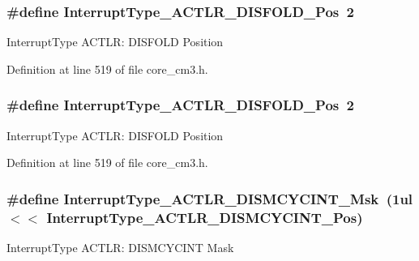 \subsubsection[{\texorpdfstring{Interrupt\+Type\+\_\+\+A\+C\+T\+L\+R\+\_\+\+D\+I\+S\+F\+O\+L\+D\+\_\+\+Pos}{InterruptType_ACTLR_DISFOLD_Pos}}]{\setlength{\rightskip}{0pt plus 5cm}\#define Interrupt\+Type\+\_\+\+A\+C\+T\+L\+R\+\_\+\+D\+I\+S\+F\+O\+L\+D\+\_\+\+Pos~2}\hypertarget{group___c_m_s_i_s___c_m3___interrupt_type_gaaa37f212111e6dbc9505d46b8bf8fa3e}{}\label{group___c_m_s_i_s___c_m3___interrupt_type_gaaa37f212111e6dbc9505d46b8bf8fa3e}
Interrupt\+Type A\+C\+T\+LR\+: D\+I\+S\+F\+O\+LD Position 

Definition at line 519 of file core\+\_\+cm3.\+h.

\subsubsection[{\texorpdfstring{Interrupt\+Type\+\_\+\+A\+C\+T\+L\+R\+\_\+\+D\+I\+S\+F\+O\+L\+D\+\_\+\+Pos}{InterruptType_ACTLR_DISFOLD_Pos}}]{\setlength{\rightskip}{0pt plus 5cm}\#define Interrupt\+Type\+\_\+\+A\+C\+T\+L\+R\+\_\+\+D\+I\+S\+F\+O\+L\+D\+\_\+\+Pos~2}\hypertarget{group___c_m_s_i_s___c_m3___interrupt_type_gaaa37f212111e6dbc9505d46b8bf8fa3e}{}\label{group___c_m_s_i_s___c_m3___interrupt_type_gaaa37f212111e6dbc9505d46b8bf8fa3e}
Interrupt\+Type A\+C\+T\+LR\+: D\+I\+S\+F\+O\+LD Position 

Definition at line 519 of file core\+\_\+cm3.\+h.

\subsubsection[{\texorpdfstring{Interrupt\+Type\+\_\+\+A\+C\+T\+L\+R\+\_\+\+D\+I\+S\+M\+C\+Y\+C\+I\+N\+T\+\_\+\+Msk}{InterruptType_ACTLR_DISMCYCINT_Msk}}]{\setlength{\rightskip}{0pt plus 5cm}\#define Interrupt\+Type\+\_\+\+A\+C\+T\+L\+R\+\_\+\+D\+I\+S\+M\+C\+Y\+C\+I\+N\+T\+\_\+\+Msk~(1ul $<$$<$ Interrupt\+Type\+\_\+\+A\+C\+T\+L\+R\+\_\+\+D\+I\+S\+M\+C\+Y\+C\+I\+N\+T\+\_\+\+Pos)}\hypertarget{group___c_m_s_i_s___c_m3___interrupt_type_ga0c020eb28544979bfac2e219ed53c999}{}\label{group___c_m_s_i_s___c_m3___interrupt_type_ga0c020eb28544979bfac2e219ed53c999}
Interrupt\+Type A\+C\+T\+LR\+: D\+I\+S\+M\+C\+Y\+C\+I\+NT Mask 

